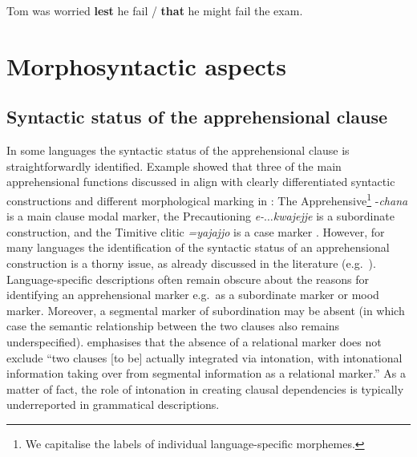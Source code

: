 \documentclass[output=paper,colorlinks,citecolor=brown]{langscibook}
\begin{document}
\ea\label{ex:intro8} Tom was worried \textbf{lest} he fail / \textbf{that} he might fail the exam.
\z



\section{Morphosyntactic aspects}
\label{sec:morph}


\subsection{Syntactic status of the apprehensional clause}
\label{intro:syntacticstatus}

In some languages the syntactic status of the apprehensional clause is straightforwardly identified. Example  showed that three of the main apprehensional functions discussed in  align with clearly differentiated syntactic constructions and different morphological marking in : The Apprehensive\footnote{We capitalise the labels of individual language-specific morphemes.}   \nobreakdash-\textit{chana} is a main clause modal marker, the Precautioning \textit{e-$\ldots$kwajejje} is a subordinate construction, and the Timitive clitic \textit{=yajajjo} is a case marker \citep{vuillermet2018a}. However, for many languages the identification of the syntactic status of an apprehensional construction is a thorny issue, as already discussed in the literature (e.g.\ \cite[230]{Austin2021}). Language-specific descriptions often remain obscure about the reasons for identifying an apprehensional marker e.g.\ as a subordinate marker or mood marker. Moreover, a segmental marker of subordination may be absent (in which case the semantic relationship between the two clauses also remains underspecified). \citet[219]{verstraete2006b} emphasises that the absence of a relational marker does not exclude ``two clauses [to be] actually integrated via intonation, with intonational information taking over from segmental information as a relational marker.'' As a matter of fact, the role of intonation in creating clausal dependencies is typically underreported in grammatical descriptions.
\end{document}
